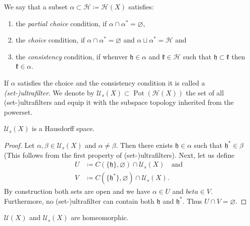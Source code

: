 \begin{defin}
  We say that a subset \(\alpha \subset \mathcal{H} \coloneqq \mathcal{H}(X)\) satisfies:
  \begin{enumerate}
  \item the \emph{partial choice} condition, if \(\alpha \cap \alpha^\ast = \varnothing\),
  \item the \emph{choice} condition, if \(\alpha \cap \alpha^\ast = \varnothing\) and \(\alpha \sqcup \alpha^\ast = \mathcal{H}\) and
  \item the \emph{consistency} condition, if whenver \(\mathfrak{h} \in \alpha\) and \(\mathfrak{k} \in \mathcal{H}\) such that \(\mathfrak{h} \subset \mathfrak{k}\) then \(\mathfrak{k} \in \alpha\).
  \end{enumerate}
  If \(\alpha\) satisfies the choice and the consistency condition it is called a \emph{(set-)ultrafilter}. We denote by \(\mathcal{U}_s(X) \subset \operatorname{Pot}(\mathcal{H}(X))\) the set of all (set-)ultrafilters and equip it with the subspace topology inherited from the powerset.
\end{defin}

\begin{lemma}
  \(\mathcal{U}_s(X)\) is a Hausdorff space.
\end{lemma}

\begin{proof}
  Let \(\alpha, \beta \in \mathcal{U}_s(X)\) and \(\alpha \neq \beta\). Then there exists \(\mathfrak{h} \in \alpha\) such that \(\mathfrak{h}^\ast \in \beta\) (This follows from the first property of (set-)ultrafilters). Next, let us define
  \begin{align*}
    U & \coloneqq C(\{\mathfrak{h}\}, \varnothing) \cap \mathcal{U}_s(X)\quad \text{and}\\
    V & \coloneqq C(\{\mathfrak{h}^\ast\},\varnothing) \cap \mathcal{U}_s(X).
  \end{align*}
  By construction both sets are open and we have \(\alpha \in U\) and \(beta \in V\). Furthermore, no (set-)ultrafilter can contain both \(\mathfrak{h}\) and \(\mathfrak{h}^\ast\). Thus \(U \cap V = \varnothing\). 
\end{proof}

\begin{thm}
  \(\mathcal{U}(X)\) and \(\mathcal{U}_s(X)\) are homeomorphic.
\end{thm}

